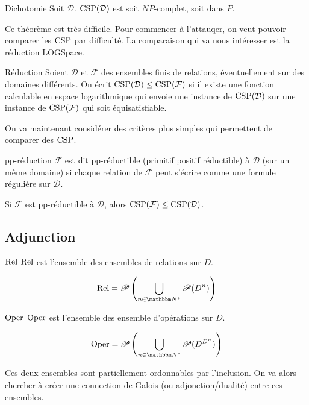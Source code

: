 \begin{theo}{Dichotomie}
    Soit $\mathcal{D}$. $\text{CSP}(\mathcal{D})$ est soit $NP$-complet, soit dans $P$.
\end{theo}

Ce théorème est très difficile. Pour commencer à l'attauqer, on veut pouvoir comparer les
$\text{CSP}$ par difficulté. La comparaison qui va nous intéresser est la réduction LOGSpace.

\begin{defi}{Réduction}
    Soient $\mathcal{D}$ et $\mathcal{F}$ des ensembles finis de relations, éventuellement
    sur des domaines différents. On écrit $\text{CSP}(\mathcal{D})\leq\text{CSP}(\mathcal{F})$ si il
    existe une fonction calculable en espace logarithmique qui envoie une instance de
    $\text{CSP}(\mathcal{D})$ sur une instance de $\text{CSP}(\mathcal{F})$ qui soit équisatisfiable.
\end{defi}

On va maintenant considérer des critères plus simples qui permettent de comparer des
$\text{CSP}$.

\begin{defi}{pp-réduction}
    $\mathcal{F}$ est dit pp-réductible (primitif positif réductible) à
    $\mathcal{D}$ (sur un même domaine) si chaque relation de $\mathcal{F}$ peut
    s'écrire comme une formule régulière sur $\mathcal{D}$.
\end{defi}

\begin{lem}
    Si $\mathcal{F}$ est pp-réductible à $\mathcal{D}$, alors
    $\text{CSP}(\mathcal{F})\leq\text{CSP}(\mathcal{D})$.
\end{lem}

\subsection{Adjunction}

\begin{defi}{$\text{Rel}$}
    $\text{Rel}$ est l'ensemble des ensembles de relations sur $D$.

    \[\Rel = \P\left(\bigcup_{n\in\N^*} \P(D^n)\right)\]
\end{defi}

\begin{defi}{$\text{Oper}$}
    $\text{Oper}$ est l'ensemble des ensemble d'opérations sur $D$.

    \[\Oper = \P\left(\bigcup_{n\in\N^*} \P(D^{D^n})\right)\]
\end{defi}

Ces deux ensembles sont partiellement ordonnables par l'inclusion. On va alors
chercher à créer une connection de Galois (ou adjonction/dualité) entre ces
ensembles.

